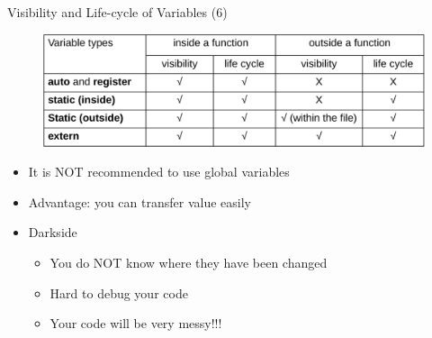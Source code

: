 \begin{frame}[fragile]{Visibility and Life-cycle of Variables (6)}
\vspace{0.1in}
\begin{figure}
	\includegraphics[width=0.8\linewidth]{figs/extern_var_eng.pdf}
\end{figure}
\begin{itemize}
	\item {It is NOT recommended to use global variables}
	\item {Advantage: you can transfer value easily}
	\item {Darkside}
	\begin{itemize}
		\item {You do NOT know where they have been changed}
		\item {Hard to debug your code}
		\item {Your code will be very messy!!!}
	\end{itemize}
\end{itemize}
\end{frame}